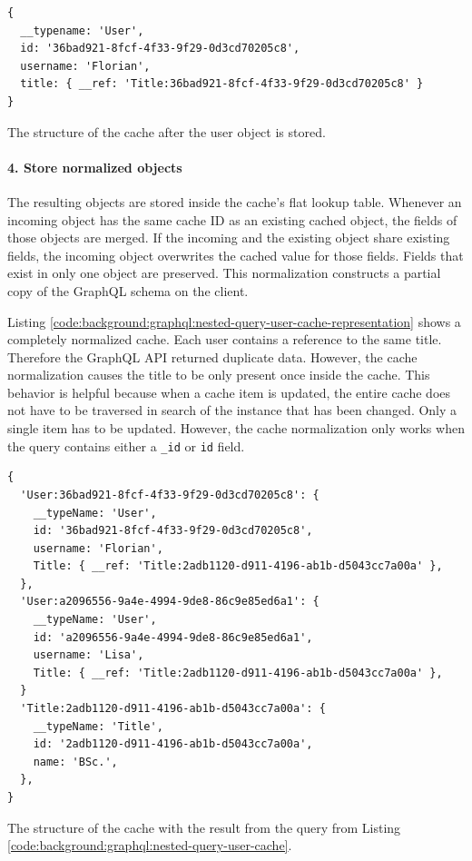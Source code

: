\ifshowListings
\begin{listing}[H]
  \begin{verbatim}
{
  __typename: 'User',
  id: '36bad921-8fcf-4f33-9f29-0d3cd70205c8',
  username: 'Florian',
  title: { __ref: 'Title:36bad921-8fcf-4f33-9f29-0d3cd70205c8' }
}
  \end{verbatim}
  \caption{The structure of the cache after the user object is stored.}\label{code:background:graphql:nested-query-response-after-replacement}
\end{listing}
\fi

\paragraph{4. Store normalized objects}\label{paragraph:background:graphql:apollo-server-client:data-normalization:store-normalized-objects}

The resulting objects are stored inside the cache's flat lookup table. Whenever an incoming object has the same cache ID as an existing cached object, the fields of those objects are merged. If the incoming and the existing object share existing fields, the incoming object overwrites the cached value for those fields. Fields that exist in only one object are preserved. This normalization constructs a partial copy of the GraphQL schema on the client. \cite{misc:-:background:graphql:apollo-client-cache-overview}

\bigskip

\noindent Listing \ref{code:background:graphql:nested-query-user-cache-representation} shows a completely normalized cache. Each user contains a reference to the same title. Therefore the GraphQL \ac{API} returned duplicate data. However, the cache normalization causes the title to be only present once inside the cache. This behavior is helpful because when a cache item is updated, the entire cache does not have to be traversed in search of the instance that has been changed. Only a single item has to be updated. However, the cache normalization only works when the query contains either a \texttt{\_id} or \texttt{id} field.

\ifshowListings
\begin{listing}[H]
  \begin{verbatim}
{
  'User:36bad921-8fcf-4f33-9f29-0d3cd70205c8': {
    __typeName: 'User',
    id: '36bad921-8fcf-4f33-9f29-0d3cd70205c8',
    username: 'Florian',
    Title: { __ref: 'Title:2adb1120-d911-4196-ab1b-d5043cc7a00a' },
  },
  'User:a2096556-9a4e-4994-9de8-86c9e85ed6a1': {
    __typeName: 'User',
    id: 'a2096556-9a4e-4994-9de8-86c9e85ed6a1',
    username: 'Lisa',
    Title: { __ref: 'Title:2adb1120-d911-4196-ab1b-d5043cc7a00a' },
  }
  'Title:2adb1120-d911-4196-ab1b-d5043cc7a00a': {
    __typeName: 'Title',
    id: '2adb1120-d911-4196-ab1b-d5043cc7a00a',
    name: 'BSc.',
  },
}
  \end{verbatim}
  \caption{The structure of the cache with the result from the query from Listing \ref{code:background:graphql:nested-query-user-cache}.}\label{code:background:graphql:nested-query-user-cache-representation}
\end{listing}
\fi

